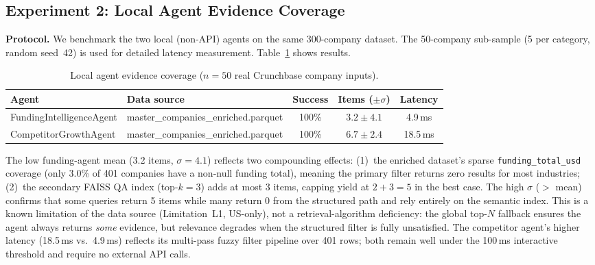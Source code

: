 \documentclass[preprint,12pt]{elsarticle}
\begin{document}
\subsection{Experiment 2: Local Agent Evidence Coverage}
\label{sec:exp2}

\textbf{Protocol.} We benchmark the two local (non-API) agents on the same
300-company dataset. The 50-company sub-sample (5 per category, random seed~42)
is used for detailed latency measurement. Table~\ref{tab:agents} shows results.

\begin{table}[t]
\centering
\caption{Local agent evidence coverage ($n{=}50$ real Crunchbase company inputs).}
\label{tab:agents}
\begin{tabularx}{\columnwidth}{lXccc}
\toprule
\textbf{Agent} & \textbf{Data source} & \textbf{Success} & \textbf{Items ($\pm\sigma$)} & \textbf{Latency} \\
\midrule
FundingIntelligenceAgent & master\_companies\_enriched.parquet & 100\% & $3.2 \pm 4.1$ & 4.9\,ms \\
CompetitorGrowthAgent    & master\_companies\_enriched.parquet & 100\% & $6.7 \pm 2.4$ & 18.5\,ms \\
\bottomrule
\end{tabularx}
\end{table}

The low funding-agent mean (3.2 items, $\sigma{=}4.1$) reflects two compounding
effects: (1)~the enriched dataset's sparse \texttt{funding\_total\_usd} coverage
(only 3.0\% of 401 companies have a non-null funding total), meaning the primary
filter returns zero results for most industries; (2)~the secondary FAISS QA index
(top-$k{=}3$) adds at most 3 items, capping yield at $2{+}3{=}5$ in the best case.
The high $\sigma$ ($>$ mean) confirms that some queries return 5 items while many
return 0 from the structured path and rely entirely on the semantic index. This is
a known limitation of the data source (Limitation~L1, US-only), not a
retrieval-algorithm deficiency: the global top-$N$ fallback ensures the agent
always returns \emph{some} evidence, but relevance degrades when the structured
filter is fully unsatisfied. The competitor agent's
higher latency (18.5\,ms vs.\ 4.9\,ms) reflects its multi-pass fuzzy filter
pipeline over 401 rows; both remain well under the 100\,ms interactive threshold
and require no external API calls.
\end{document}
